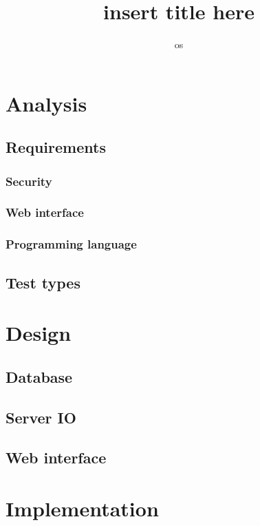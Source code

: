 

\title{insert title here}
\author{os}


\maketitle
\tableofcontents



\chapter{Analysis}
  \section{Requirements}
    \subsection{Security}
    \subsection{Web interface}
    \subsection{Programming language}
    
  \section{Test types}

\chapter{Design}
  \section{Database}
  \section{Server IO}
  \section{Web interface}

\chapter{Implementation}
